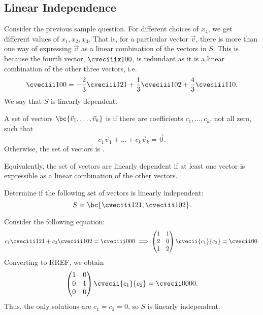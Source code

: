 \subsection{Linear Independence}

Consider the previous sample question. For different choices of $x_4$, we get different values of $x_1, x_2, x_3$. That is, for a particular vector $\vec v$, there is more than one way of expressing $\vec v$ as a linear combination of the vectors in $S$. This is because the fourth vector, $\cveciiix100$, is redundant as it is a linear combination of the other three vectors, i.e. \[\cveciii100 = -\frac23 \cveciii121 + \frac13 \cveciii102 + \frac43 \cveciii110.\] We say that $S$ is linearly dependent.

\begin{definition}
    A set of vectors $\bc{\vec v_1, \dots, \vec v_k}$ is  if there are coefficients $c_1, \dots, c_k$, not all zero, such that \[c_1 \vec v_1 + \dots + c_k \vec v_k = \vec 0.\] Otherwise, the set of vectors is .
\end{definition}

Equivalently, the set of vectors are linearly dependent if at least one vector is expressible as a linear combination of the other vectors.

\begin{sample}
    Determine if the following set of vectors is linearly independent: \[S = \bc{\cveciii121, \cveciii102}.\]
\end{sample}
\begin{sampans}
    Consider the following equation: \[c_1 \cveciii121 + c_2 \cveciii102 = \cveciii000 \implies \begin{pmatrix}1 & 1 \\ 2 & 0 \\ 1 & 2 \end{pmatrix} \cvecii{c_1}{c_2} = \cvecii00.\] Converting to RREF, we obtain \[\begin{pmatrix}1 & 0 \\ 0 & 1 \\ 0 & 0 \end{pmatrix} \cvecii{c_1}{c_2} = \cvecii0000.\] Thus, the only solutions are $c_1 = c_2 = 0$, so $S$ is linearly independent.
\end{sampans}

